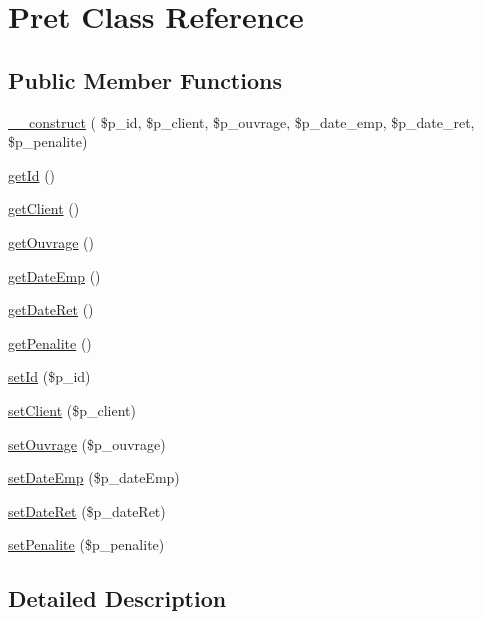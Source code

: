 \hypertarget{class_pret}{}\section{Pret Class Reference}
\label{class_pret}
\subsection*{Public Member Functions}
\begin{DoxyCompactItemize}
\item 
\hyperlink{class_pret_aff90a1966dd0404d05a530676aec0472}{\+\_\+\+\_\+construct} ( \$p\+\_\+id, \$p\+\_\+client, \$p\+\_\+ouvrage, \$p\+\_\+date\+\_\+emp, \$p\+\_\+date\+\_\+ret, \$p\+\_\+penalite)
\item 
\hyperlink{class_pret_a12251d0c022e9e21c137a105ff683f13}{get\+Id} ()
\item 
\hyperlink{class_pret_a2f5f44fdf5404c87cc3a7b5719d85306}{get\+Client} ()
\item 
\hyperlink{class_pret_a60362b06c32bb1a659f65d6d54857021}{get\+Ouvrage} ()
\item 
\hyperlink{class_pret_afa67d7628b29e3e32469cd070ae19f10}{get\+Date\+Emp} ()
\item 
\hyperlink{class_pret_a85740f396854605d6a989fac86cabba2}{get\+Date\+Ret} ()
\item 
\hyperlink{class_pret_a0eac81d4f3534a285e7abe04dc6a2b4c}{get\+Penalite} ()
\item 
\hyperlink{class_pret_ab2fff0fc655f96b6e5f4fcc294c49eee}{set\+Id} (\$p\+\_\+id)
\item 
\hyperlink{class_pret_addc317db48b6f5bddc99581c2c6464eb}{set\+Client} (\$p\+\_\+client)
\item 
\hyperlink{class_pret_a721ed73a4d5b195a2cf9e0ec9001cad7}{set\+Ouvrage} (\$p\+\_\+ouvrage)
\item 
\hyperlink{class_pret_aa698d4791c453b088a1428cd5244b3bd}{set\+Date\+Emp} (\$p\+\_\+date\+Emp)
\item 
\hyperlink{class_pret_a9235ca829aedf23f31a1d408e9fc9d30}{set\+Date\+Ret} (\$p\+\_\+date\+Ret)
\item 
\hyperlink{class_pret_a91be6085dead298d8a7f2d4358ec8607}{set\+Penalite} (\$p\+\_\+penalite)
\end{DoxyCompactItemize}


\subsection{Detailed Description}


